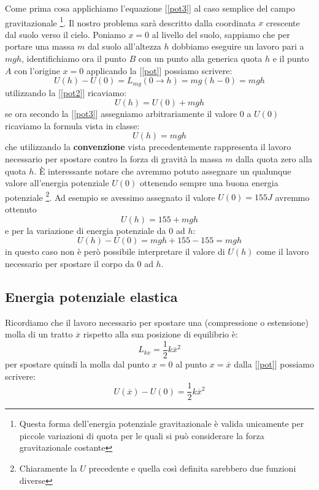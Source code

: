 \documentclass[a4paper,10pt,oneside]{article}
\begin{document}
Come prima cosa applichiamo  l'equazione [\ref{pot3}] al caso semplice del campo gravitazionale \footnote{Questa forma dell'energia potenziale gravitazionale è valida unicamente per piccole variazioni di quota per le quali si può considerare la forza gravitazionale costante}.
Il nostro problema sarà descritto dalla coordinata $x$ crescente dal suolo verso il cielo. Poniamo $x=0$ al livello del suolo, sappiamo che per portare una massa $m$ dal suolo all'altezza $h$ dobbiamo eseguire un lavoro pari a $mgh$, identifichiamo ora il punto $B$ con un punto alla generica quota $h$ e il punto $A$ con l'origine $x=0$ applicando la [\ref{pot}] possiamo scrivere:
\begin{equation}
U(h)-U(0)=L_{mg}(0\to h)=mg(h-0)=mgh
\end{equation}
utilizzando la [\ref{pot2}] ricaviamo:
\begin{equation}
 U(h)=U(0)+mgh
\end{equation}
se ora secondo la [\ref{pot3}] assegniamo arbitrariamente il valore 0 a $U(0)$ ricaviamo la formula vista in classe:
\begin{equation}
 U(h)=mgh
\end{equation}
che utilizzando  la \textbf{convenzione} vista precedentemente rappresenta il lavoro necessario per spostare contro la forza di gravità la massa $m$ dalla quota zero alla quota $h$. È interessante notare che avremmo potuto assegnare un qualunque valore all'energia potenziale $U(0)$ ottenendo sempre una buona energia potenziale \footnote{Chiaramente la $U$ precedente e quella così definita sarebbero due funzioni diverse}. Ad esempio se avessimo assegnato il valore $U(0)=155J$ avremmo ottenuto
\begin{equation}
 U(h)=155+mgh
\end{equation}
e per la variazione di energia potenziale da 0 ad $h$:
\begin{equation}
 U(h)-U(0)=mgh+155-155=mgh
\end{equation}
in questo caso non è però possibile interpretare il valore di $U(h)$ come il lavoro necessario per spostare il corpo da 0 ad $h$.

\subsection*{Energia potenziale elastica}

Ricordiamo che il lavoro necessario per spostare una (compressione o estensione) molla di un tratto $\overline x$ rispetto alla sua posizione di equilibrio è:
\begin{equation}
 L_{kx}=\frac{1}{2}k\overline x^2
\end{equation}
per spostare quindi la molla dal punto $x=0$ al punto $x=\overline x$ dalla [\ref{pot}] possiamo scrivere:
\begin{equation}
 U(\overline x)-U(0)=\frac 1 2 k\overline x^2
\end{equation}
\end{document}
